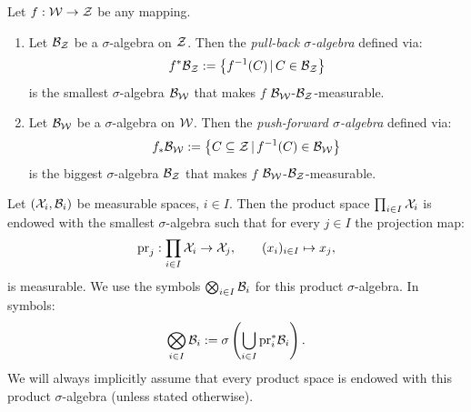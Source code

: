 \begin{DefLem}
    \label{sigma-algebra-map}
    Let $f: \mathcal{W} \to \mathcal{Z}$ be any mapping.
    \begin{enumerate}
        \item Let $\mathcal{B}_{\mathcal{Z}}$ be a $\sigma$-algebra on $\mathcal{Z}$. Then the \emph{pull-back $\sigma$-algebra} defined via:
            \[ f^*\mathcal{B}_{\mathcal{Z}} := \left \{ f^{-1}(C)\,|\, C \in \mathcal{B}_{\mathcal{Z}}   \right \} \]
            is the smallest $\sigma$-algebra $\mathcal{B}_{\mathcal{W}}$ that makes $f$ $\mathcal{B}_{\mathcal{W}}$-$\mathcal{B}_{\mathcal{Z}}$-measurable.
        \item Let $\mathcal{B}_{\mathcal{W}}$ be a $\sigma$-algebra on $\mathcal{W}$. Then the \emph{push-forward $\sigma$-algebra} defined via:
            \[ f_*\mathcal{B}_{\mathcal{W}} := \left \{ C \subseteq \mathcal{Z}\,|\, f^{-1}(C) \in \mathcal{B}_{\mathcal{W}}   \right \} \]
            is the biggest $\sigma$-algebra $\mathcal{B}_{\mathcal{Z}}$ that makes $f$ $\mathcal{B}_{\mathcal{W}}$-$\mathcal{B}_{\mathcal{Z}}$-measurable.
    \end{enumerate}
\end{DefLem}


\begin{Def}
    Let $(\mathcal{X}_i,\mathcal{B}_i)$ be measurable spaces, $i \in I$.
    Then the product space $\prod_{i \in I} \mathcal{X}_i$ is endowed with the smallest $\sigma$-algebra
    such that for every $j\in I$ the projection map:
    \[ \mathrm{pr}_j: \prod_{i \in I} \mathcal{X}_i \to \mathcal{X}_j,\qquad (x_i)_{i \in I} \mapsto x_j, \]
    is measurable. We use the symbols $\bigotimes_{i \in I} \mathcal{B}_i$ for this product $\sigma$-algebra.
    In symbols:
    \[ \bigotimes_{i \in I} \mathcal{B}_i := \sigma\left ( \bigcup_{i \in I} \mathrm{pr}_i^*\mathcal{B}_i\right ). \]
  We will always implicitly assume that every product space is endowed with this product $\sigma$-algebra (unless stated otherwise).
\end{Def}



